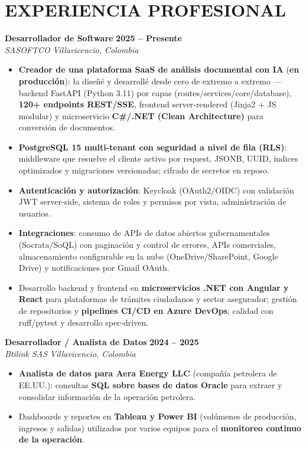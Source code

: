 \documentclass[letterpaper,10pt]{article}
\begin{document}
\section{EXPERIENCIA PROFESIONAL}

\textbf{Desarrollador de Software} \hfill \textbf{2025 -- Presente} \\
\textit{SASOFTCO} \hfill \textit{Villavicencio, Colombia}
\begin{itemize}
    \item \textbf{Creador de una plataforma SaaS de análisis documental con IA} (\textbf{en producción}): la diseñé y desarrollé desde cero de extremo a extremo — backend FastAPI (Python 3.11) por capas (routes/services/core/database), \textbf{120+ endpoints REST/SSE}, frontend server-rendered (Jinja2 + JS modular) y microservicio \textbf{C\#/.NET (Clean Architecture)} para conversión de documentos.
    \item \textbf{PostgreSQL 15 multi-tenant con seguridad a nivel de fila (RLS)}: middleware que resuelve el cliente activo por request, JSONB, UUID, índices optimizados y migraciones versionadas; cifrado de secretos en reposo.
    \item \textbf{Autenticación y autorización}: Keycloak (OAuth2/OIDC) con validación JWT server-side, sistema de roles y permisos por vista, administración de usuarios.
    \item \textbf{Integraciones}: consumo de APIs de datos abiertos gubernamentales (Socrata/SoQL) con paginación y control de errores, APIs comerciales, almacenamiento configurable en la nube (OneDrive/SharePoint, Google Drive) y notificaciones por Gmail OAuth.
    \item Desarrollo backend y frontend en \textbf{microservicios .NET con Angular y React} para plataformas de trámites ciudadanos y sector asegurador; gestión de repositorios y \textbf{pipelines CI/CD en Azure DevOps}; calidad con ruff/pytest y desarrollo spec-driven.
\end{itemize}

\textbf{Desarrollador / Analista de Datos} \hfill \textbf{2024 -- 2025} \\
\textit{Btilink SAS} \hfill \textit{Villavicencio, Colombia}
\begin{itemize}
    \item \textbf{Analista de datos para Aera Energy LLC} (compañía petrolera de EE.UU.): consultas \textbf{SQL sobre bases de datos Oracle} para extraer y consolidar información de la operación petrolera.
    \item Dashboards y reportes en \textbf{Tableau y Power BI} (volúmenes de producción, ingresos y salidas) utilizados por varios equipos para el \textbf{monitoreo continuo de la operación}.
\end{itemize}
\end{document}
